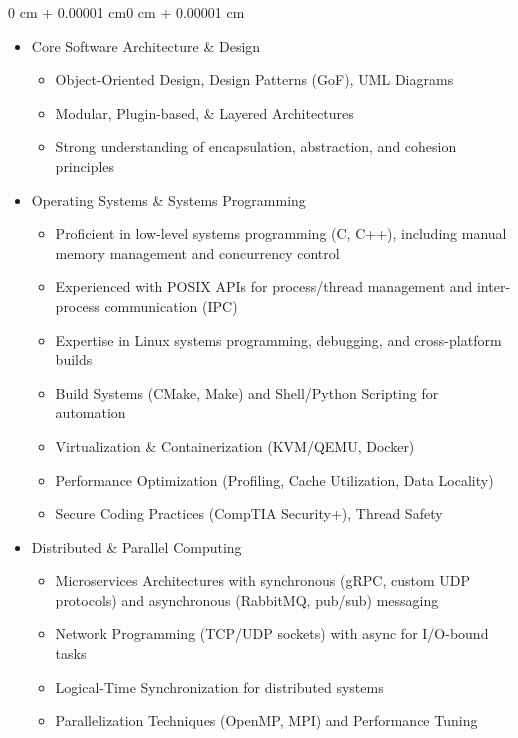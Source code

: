 \documentclass[10pt, letterpaper]{article}
\newenvironment{onecolentry}{
    \begin{adjustwidth}{0 cm + 0.00001 cm}{0 cm + 0.00001 cm}
}{
    \end{adjustwidth}
}
\begin{document}
\begin{onecolentry}
    \begin{itemize}[leftmargin=0.4 cm]
        \item Core Software Architecture \& Design
        \begin{itemize}
            \item Object-Oriented Design, Design Patterns (GoF), UML Diagrams
            \item Modular, Plugin-based, \& Layered Architectures
            \item Strong understanding of encapsulation, abstraction, and cohesion principles
        \end{itemize}

        \item Operating Systems \& Systems Programming
        \begin{itemize}
            \item Proficient in low-level systems programming (C, C++), including manual memory management and concurrency control
            \item Experienced with POSIX APIs for process/thread management and inter-process communication (IPC)
            \item Expertise in Linux systems programming, debugging, and cross-platform builds
            \item Build Systems (CMake, Make) and Shell/Python Scripting for automation
            \item Virtualization \& Containerization (KVM/QEMU, Docker)
            \item Performance Optimization (Profiling, Cache Utilization, Data Locality)
            \item Secure Coding Practices (CompTIA Security+), Thread Safety
        \end{itemize}

        \item Distributed \& Parallel Computing
        \begin{itemize}
            \item Microservices Architectures with synchronous (gRPC, custom UDP protocols) and asynchronous (RabbitMQ, pub/sub) messaging
            \item Network Programming (TCP/UDP sockets) with async for I/O-bound tasks
            \item Logical-Time Synchronization for distributed systems
            \item Parallelization Techniques (OpenMP, MPI) and Performance Tuning
        \end{itemize}


\end{itemize}
\end{onecolentry}
\end{document}
